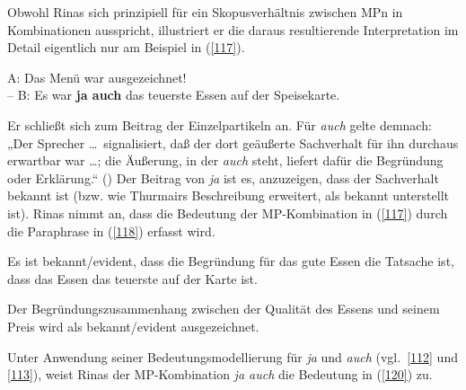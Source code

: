 \noindent
Obwohl Rinas sich prinzipiell für ein Skopusverhältnis  zwischen MPn in Kombinationen ausspricht, illustriert er die daraus resultierende Interpretation im Detail eigentlich nur am Beispiel in (\ref{117}).

\begin{exe}
	\ex\label{117} 
		A: Das Menü war ausgezeichnet!\\ 
		– B: Es war \textbf{ja auch} das teuerste Essen auf der Speisekarte.\\
		\hbox{}\hfill\hbox{\citet[242]{Rinas2007}}
\end{exe}
Er schließt sich \citet[155]{Thurmair1989} zum Beitrag der Einzelpartikeln an. Für \textit{auch} gelte demnach: „Der Sprecher \ldots\ signalisiert, daß der dort geäußerte Sachverhalt für ihn durchaus erwartbar war \ldots; die Äußerung, in der \textit{auch} steht, liefert dafür die Begründung oder Erklärung.“ (\citealt[209]{Thurmair1989}) Der Beitrag von \textit{ja} ist es, anzuzeigen, dass der Sachverhalt bekannt ist (bzw. wie \citealt[243--244]{Rinas2007} Thurmairs Beschreibung erweitert, als bekannt unterstellt ist). Rinas nimmt an, dass die Bedeutung der MP-Kombination in (\ref{117}) durch die Paraphrase in (\ref{118}) erfasst wird. 

\begin{exe}
	\ex\label{118} 
		Es ist bekannt/evident, dass die Begründung für das gute Essen die Tatsache ist, dass das Essen das teuerste auf der Karte ist.
\end{exe}
Der Begründungszusammenhang zwischen der Qualität des Essens und seinem Preis wird als bekannt/evident ausgezeichnet. 

Unter Anwendung seiner Bedeutungsmodellierung für \textit{ja} und \textit{auch} (vgl.\ \ref{112} und \ref{113}), weist Rinas der MP-Kombination \textit{ja auch} die Bedeutung in (\ref{120}) zu.

